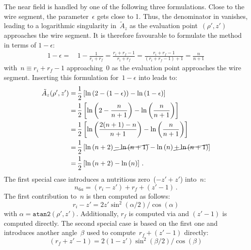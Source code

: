 The near field is handled by one of the following three formulations.
Close to the wire segment, the parameter~$\epsilon$ gets close to 1.
Thus, the denominator in  vanishes, leading to a logarithmic singularity in~$\tilde{A}_z$
as the evaluation point~$(\rho', z')$ approaches the wire segment.
It is therefore favourable to formulate the method in terms of $1-\epsilon$:
\begin{align}
  1-\epsilon =&\, 1 - \frac{1}{r_i + r_f} = \frac{r_i + r_f - 1}{r_i + r_f} = \frac{r_i + r_f - 1}{(r_i + r_f - 1) + 1} = \frac{n}{n + 1}
\end{align}
with~$n \equiv r_i + r_f - 1$ approaching~$0$ as the evaluation point approaches the wire segment.
Inserting this formulation for~$1-\epsilon$ into  leads to:
\begin{align}
  \tilde{A}_z (\rho', z')
  =&\, \frac{1}{2}  \left[ \ln\left(2 - (1-\epsilon)        \right) - \ln \left(1 - \epsilon    \right) \right] \nonumber \\
  =&\, \frac{1}{2}  \left[ \ln\left(2 - \frac{n}{n + 1}     \right) - \ln \left(\frac{n}{n + 1} \right) \right] \nonumber \\
  =&\, \frac{1}{2}  \left[ \ln\left(\frac{2(n+1) - n}{n + 1}\right) - \ln \left(\frac{n}{n + 1} \right) \right] \nonumber \\
  =&\, \frac{1}{2}  \left[ \ln\left(n + 2                   \right) \cancel{- \ln\left(n + 1 \right)} - \ln \left( n \right) \cancel{+ \ln \left( n + 1 \right)} \right] \nonumber \\
  =&\, \frac{1}{2}  \left[ \ln\left(n + 2                   \right) - \ln \left( n \right) \right] \, .
\end{align}
The first special case introduces a nutritious zero~($-z' + z'$) into~$n$:
\begin{equation}
  n_{6a} = (r_i - z') + r_f + (z'-1) \, .
\end{equation}
The first contribution to~$n$ is then computed as follows:
\begin{equation}
  r_i - z' = 2 z' \sin^2(\alpha/2) / \cos(\alpha) \label{eqn:ri_zp}
\end{equation}
with $\alpha = \texttt{atan2}(\rho', z')$.
Additionally, $r_f$ is computed via  and $(z'-1)$ is computed directly.
The second special case is based on the first one and introduces another angle~$\beta$
used to compute~$r_f + (z'-1)$ directly:
\begin{equation}
  (r_f + z' - 1) = 2 (1 - z') \sin^2(\beta/2) / \cos(\beta) \label{eqn:rf_zp_1}
\end{equation}
